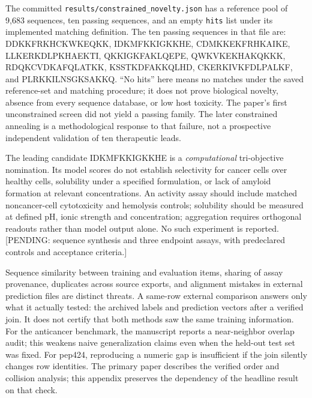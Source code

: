 The committed \texttt{results/constrained\_novelty.json} has a reference pool of 9,683 sequences, ten passing sequences, and an empty \texttt{hits} list under its implemented matching definition. The ten passing sequences in that file are: DDKKFRKHCKWKEQKK, IDKMFKKIGKKHE, CDMKKEKFRHKAIKE, LLKERKDLPKHAEKTI, QKKIGKFAKLQEPE, QWKVKEKHAKQKKK, RDQKCVDKAFQLATKK, KSSTKDFAKKQLHD, CKERKIVKFDLPALKF, and PLRKKILNSGKSAKKQ. ``No hits'' here means no matches under the saved reference-set and matching procedure; it does not prove biological novelty, absence from every sequence database, or low host toxicity. The paper's first unconstrained screen did not yield a passing family. The later constrained annealing is a methodological response to that failure, not a prospective independent validation of ten therapeutic leads.

The leading candidate IDKMFKKIGKKHE is a \emph{computational} tri-objective nomination. Its model scores do not establish selectivity for cancer cells over healthy cells, solubility under a specified formulation, or lack of amyloid formation at relevant concentrations. An activity assay should include matched noncancer-cell cytotoxicity and hemolysis controls; solubility should be measured at defined pH, ionic strength and concentration; aggregation requires orthogonal readouts rather than model output alone. No such experiment is reported. {[}PENDING: sequence synthesis and three endpoint assays, with predeclared controls and acceptance criteria.{]}


Sequence similarity between training and evaluation items, sharing of assay provenance, duplicates across source exports, and alignment mistakes in external prediction files are distinct threats. A same-row external comparison answers only what it actually tested: the archived labels and prediction vectors after a verified join. It does not certify that both methods saw the same training information. For the anticancer benchmark, the manuscript reports a near-neighbor overlap audit; this weakens naive generalization claims even when the held-out test set was fixed. For pep424, reproducing a numeric gap is insufficient if the join silently changes row identities. The primary paper describes the verified order and collision analysis; this appendix preserves the dependency of the headline result on that check.

